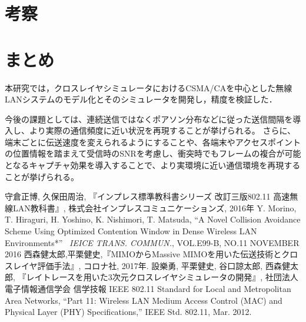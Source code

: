 \documentclass[a4paper,10pt]{ltjsarticle}
\begin{document}
\clearpage
\section{考察}


\clearpage
\section{まとめ}

本研究では，クロスレイヤシミュレータにおけるCSMA/CAを中心とした無線LANシステムのモデル化とそのシミュレータを開発し，精度を検証した．

今後の課題としては、連続送信ではなくポアソン分布などに従った送信間隔を導入し、より実際の通信頻度に近い状況を再現することが挙げられる。
さらに、端末ごとに伝送速度を変えられるようにすることや、各端末やアクセスポイントの位置情報を踏まえて受信時のSNRを考慮し、衝突時でもフレームの複合が可能となるキャプチャ効果を導入することで、より実環境に近い通信環境を再現することが挙げられる。



\clearpage
{}
\begin{thebibliography}{99}

守倉正博, 久保田周治, 『インプレス標準教科書シリーズ 改訂三版802.11 高速無線LAN教科書』, 株式会社インプレスコミュニケーションズ, 2016年
Y. Morino, T. Hiraguri, H. Yoshino, K. Nishimori, T. Matsuda, ``A Novel Collision Avoidance Scheme Using Optimized Contention Window in Dense Wireless LAN Environments*'' \, \textit{IEICE TRANS. COMMUN.}, VOL.E99-B, NO.11 NOVEMBER 2016
西森健太郎,平栗健史,『MIMOからMassive MIMOを用いた伝送技術とクロスレイヤ評価手法』, コロナ社, 2017年.
設樂勇, 平栗健史, 谷口諒太郎, 西森健太郎, 『レイトレースを用いた3次元クロスレイヤシミュレータの開発』, 社団法人 電子情報通信学会 信学技報
IEEE 802.11 Standard for Local and Metropolitan Area
Networks, “Part 11: Wireless LAN Medium Access Control (MAC) and Physical Layer (PHY) Speciﬁcations,”  IEEE Std. 802.11, Mar. 2012.
\end{thebibliography}
\end{document}
